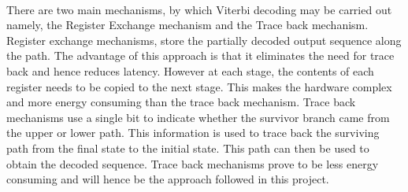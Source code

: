 \documentclass[14pt]{report}
\begin{document}
{\paragraph{} There are two main mechanisms, by which Viterbi decoding may be carried out namely, the Register Exchange mechanism and the Trace back mechanism. Register exchange mechanisms, store the partially decoded output sequence along the path. The advantage of this approach is that it eliminates the need for trace back and hence reduces latency. However at each stage, the contents of each register needs to be copied to the next stage. This makes the hardware complex and more energy consuming than the trace back mechanism. Trace back mechanisms use a single bit to indicate whether the survivor branch came from the upper or lower path. This information is used to trace back the surviving path from the final state to the initial state. This path can then be used to obtain the decoded sequence. Trace back mechanisms prove to be less energy consuming and will hence be the approach followed in this project.}
\end{document}
